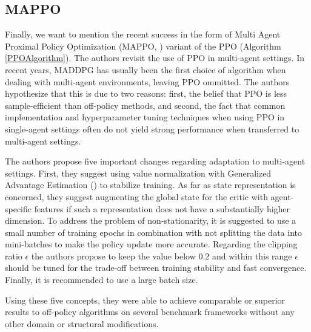 \subsection*{MAPPO}
Finally, we want to mention the recent success in the form of Multi Agent Proximal Policy Optimization (MAPPO, \cite{MAPPO}) variant of the PPO (Algorithm \ref{PPOAlgorithm}).
The authors revisit the use of PPO in multi-agent settings.
In recent years, MADDPG has usually been the first choice of algorithm when dealing with multi-agent environments, leaving PPO ommitted.
The authors hypothesize that this is due to two reasons: first, the belief that PPO is less sample-efficient than off-policy methods, and second, the fact that common implementation and hyperparameter tuning techniques when using PPO in single-agent settings often do not yield strong performance when transferred to multi-agent settings.

The authors propose five important changes regarding adaptation to multi-agent settings.
First, they suggest using value normalization with Generalized Advantage Estimation (\cite{GAE}) to stabilize training.
As far as state representation is concerned, they suggest augmenting the global state for the critic with agent-specific features if such a representation does not have a substantially higher dimension.
To address the problem of non-stationarity, it is suggested to use a small number of training epochs in combination with not splitting the data into mini-batches to make the policy update more accurate.
Regarding the clipping ratio $\epsilon$ the authors propose to keep the value below $0.2$ and within this range $\epsilon$ should be tuned for the trade-off between training stability and fast convergence.
Finally, it is recommended to use a large batch size.

Using these five concepts, they were able to achieve comparable or superior results to off-policy algorithms on several benchmark frameworks without any other domain or structural modifications.





